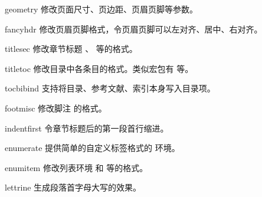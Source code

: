 \begin{pkglist}
  \item[geometry]    修改页面尺寸、页边距、页眉页脚等参数。
  \item[fancyhdr]    修改页眉页脚格式，令页眉页脚可以左对齐、居中、右对齐。
  \item[titlesec]    修改章节标题 、 等的格式。
  \item[titletoc]    修改目录中各条目的格式。类似宏包有  等。
  \item[tocbibind]   支持将目录、参考文献、索引本身写入目录项。
  \item[footmisc]    修改脚注  的格式。
  \item[indentfirst] 令章节标题后的第一段首行缩进。
  \item[enumerate]   提供简单的自定义标签格式的  环境。
  \item[enumitem]    修改列表环境  和  等的格式。
  \item[lettrine]    生成段落首字母大写的效果。
\end{pkglist}

\endinput
